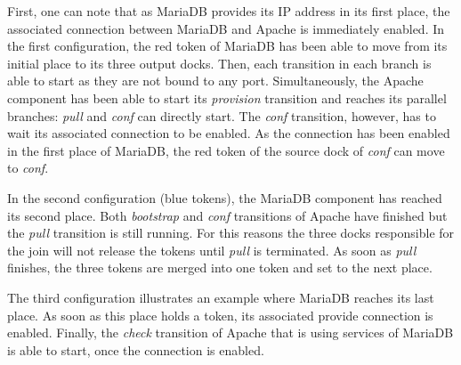 First, one can note that as MariaDB provides its IP address in its
first place, the associated connection between MariaDB and Apache is
immediately enabled. In the first configuration, the red token of MariaDB
has been able to move from its initial place to its three output
docks. Then, each transition in each branch is able to start as they
are not bound to any port. Simultaneously, the Apache component has
been able to start its \emph{provision} transition and reaches its
parallel branches: \emph{pull} and \emph{conf} can directly start. The
\emph{conf} transition, however, has to wait its associated connection
to be enabled. As the connection has been enabled in the first place
of MariaDB, the red token of the source dock of \emph{conf} can move
to \emph{conf}.

In the second configuration (blue tokens), the MariaDB component has reached
its second place. Both \emph{bootstrap} and \emph{conf} transitions of Apache
have finished but the \emph{pull} transition is still running. For this
reasons the three docks responsible for the join will not release the
tokens until \emph{pull} is terminated. As soon as \emph{pull}
finishes, the three tokens are merged into one token and set to the
next place.%

The third configuration illustrates an example where MariaDB reaches
its last place. As soon as this place holds a token, its associated
provide connection is enabled. Finally, the \emph{check}
transition of Apache that is using services of MariaDB is able to
start, once the connection is enabled.
